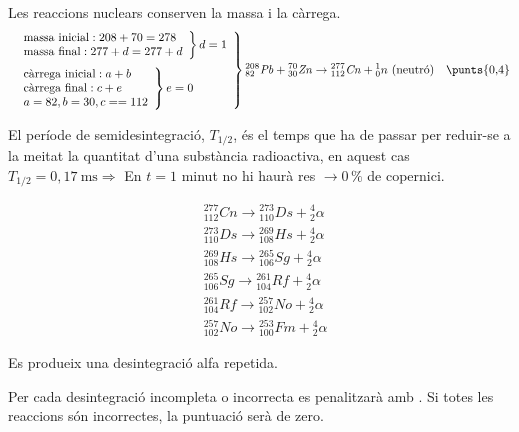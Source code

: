 \begin{solapartat}
Les reaccions nuclears conserven la massa i la càrrega.
\[ \left.\begin{array}{l}
\left.\begin{array}{l} \text{massa inicial}: 208 + 70 = 278\\ \text{massa final}: 277 + d = 277 + d \end{array}\right\}d = 1\\[3ex]
\left.\begin{array}{l} \text{càrrega inicial}: a + b\\ \text{càrrega final}: c + e\\ a = 82, b = 30, c == 112 \end{array}\right\}e = 0
\end{array}\right\}
{}^{208}_{82}\mathit{Pb} + {}^{70}_{30}\mathit{Zn} \rightarrow {}^{277}_{112}\mathit{Cn} + {}^{1}_{0}n\ \text{(neutró)} \quad \text{\punts{0,4}} \]

 El període de semidesintegració, $T_{1/2}$, és el temps que ha de passar per reduir-se a la meitat la quantitat d'una substància radioactiva, en aquest cas $T_{1/2} = 0,17\ \mathrm{ms} \Rightarrow$ En $t = 1$ minut no hi haurà res $\rightarrow 0\,\%$ de copernici.
\end{solapartat}

\begin{solapartat}
\begin{minipage}[c]{0.45\linewidth}
\begin{align*}
&{}^{277}_{112}\mathit{Cn} \rightarrow {}^{273}_{110}\mathit{Ds} + {}^{4}_{2}\alpha\\
&{}^{273}_{110}\mathit{Ds} \rightarrow {}^{269}_{108}\mathit{Hs} + {}^{4}_{2}\alpha\\
&{}^{269}_{108}\mathit{Hs} \rightarrow {}^{265}_{106}\mathit{Sg} + {}^{4}_{2}\alpha\\
&{}^{265}_{106}\mathit{Sg} \rightarrow {}^{261}_{104}\mathit{Rf} + {}^{4}_{2}\alpha\\
&{}^{261}_{104}\mathit{Rf} \rightarrow {}^{257}_{102}\mathit{No} + {}^{4}_{2}\alpha\\
&{}^{257}_{102}\mathit{No} \rightarrow {}^{253}_{100}\mathit{Fm} + {}^{4}_{2}\alpha
\end{align*}
\end{minipage}\hfill
\begin{minipage}[c]{0.4\linewidth}
Es produeix una desintegració alfa repetida.
\end{minipage}

Per cada desintegració incompleta o incorrecta es penalitzarà amb \unskip. Si totes les reaccions són incorrectes, la puntuació serà de \textcolor{red!70!black}{zero}.
\end{solapartat}
